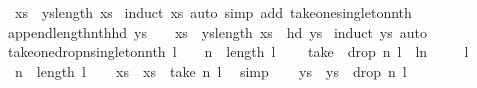 \begin{isabellebody}
\ \ {\isacharbrackleft}{\isacharparenleft}xs\ {\isacharat}\ ys{\isacharparenright}{\isacharbang}{\isacharparenleft}length\ xs{\isacharparenright}{\isacharbrackright}{\isachardoublequoteclose}\isanewline
%
\isadelimproof
%
\endisadelimproof
%
\isatagproof
{}\isamarkupfalse%
\ {\isacharparenleft}induct\ xs{\isacharcomma}\ auto\ simp\ add{\isacharcolon}\ take{\isacharunderscore}one{\isacharunderscore}singleton{\isacharunderscore}nth{\isacharparenright}%
\endisatagproof
{\isafoldproof}%
%
\isadelimproof
\isanewline
%
\endisadelimproof
\isanewline
{}\isamarkupfalse%
\ append{\isacharunderscore}length{\isacharunderscore}nth{\isacharunderscore}hd{\isacharcolon}\ {\isachardoublequoteopen}ys\ {\isasymnoteq}\ {\isacharbrackleft}{\isacharbrackright}\ {\isasymLongrightarrow}\ {\isacharbrackleft}{\isacharparenleft}xs\ {\isacharat}\ ys{\isacharparenright}{\isacharbang}{\isacharparenleft}length\ xs{\isacharparenright}{\isacharbrackright}\ {\isacharequal}\ {\isacharbrackleft}hd\ ys{\isacharbrackright}{\isachardoublequoteclose}\isanewline
%
\isadelimproof
%
\endisadelimproof
%
\isatagproof
{}\isamarkupfalse%
\ {\isacharparenleft}induct\ ys{\isacharcomma}\ auto{\isacharparenright}%
\endisatagproof
{\isafoldproof}%
%
\isadelimproof
\isanewline
%
\endisadelimproof
\isanewline
{}\isamarkupfalse%
\ take{\isacharunderscore}one{\isacharunderscore}drop{\isacharunderscore}n{\isacharunderscore}singleton{\isacharunderscore}nth{\isacharcolon}\ {\isachardoublequoteopen}l\ {\isasymnoteq}\ {\isacharbrackleft}{\isacharbrackright}\ {\isasymLongrightarrow}\ n\ {\isacharless}\ length\ l\ {\isasymLongrightarrow}\ \isanewline
\ \ take\ {}\ {\isacharparenleft}drop\ n\ l{\isacharparenright}\ {\isacharequal}\ {\isacharbrackleft}l{\isacharbang}n{\isacharbrackright}{\isachardoublequoteclose}\isanewline
%
\isadelimproof
%
\endisadelimproof
%
\isatagproof
{}\isamarkupfalse%
{\isacharminus}\isanewline
\ \ \isamarkupfalse%
\ {}{\isacharcolon}\ {\isachardoublequoteopen}l\ {\isasymnoteq}\ {\isacharbrackleft}{\isacharbrackright}{\isachardoublequoteclose}\isanewline
\ \ \isamarkupfalse%
\ {}{\isacharcolon}\ {\isachardoublequoteopen}n\ {\isacharless}\ length\ l{\isachardoublequoteclose}\isanewline
\ \ \isamarkupfalse%
\ xs\ \ {\isachardoublequoteopen}xs\ {\isacharequal}\ take\ n\ l{\isachardoublequoteclose}\ \isamarkupfalse%
\ simp\isanewline
\ \ \isamarkupfalse%
\ ys\ \ {\isachardoublequoteopen}ys\ {\isacharequal}\ drop\ n\ l{\isachardoublequoteclose}\ \isamarkupfalse%

\end{isabellebody}

